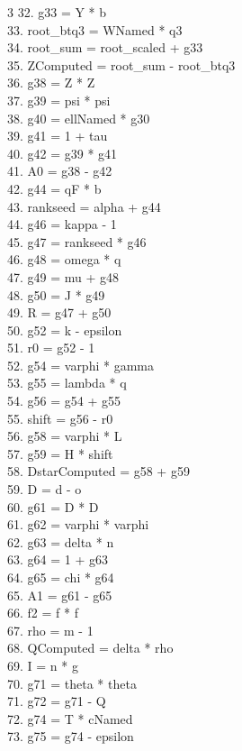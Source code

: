 \documentclass[10pt]{article}
\begin{document}
\begin{multicols}{3}
32. g33 = Y * b\\
33. root\_btq3 = WNamed * q3\\
34. root\_sum = root\_scaled + g33\\
35. ZComputed = root\_sum - root\_btq3\\
36. g38 = Z * Z\\
37. g39 = psi * psi\\
38. g40 = ellNamed * g30\\
39. g41 = 1 + tau\\
40. g42 = g39 * g41\\
41. A0 = g38 - g42\\
42. g44 = qF * b\\
43. rankseed = alpha + g44\\
44. g46 = kappa - 1\\
45. g47 = rankseed * g46\\
46. g48 = omega * q\\
47. g49 = mu + g48\\
48. g50 = J * g49\\
49. R = g47 + g50\\
50. g52 = k - epsilon\\
51. r0 = g52 - 1\\
52. g54 = varphi * gamma\\
53. g55 = lambda * q\\
54. g56 = g54 + g55\\
55. shift = g56 - r0\\
56. g58 = varphi * L\\
57. g59 = H * shift\\
58. DstarComputed = g58 + g59\\
59. D = d - o\\
60. g61 = D * D\\
61. g62 = varphi * varphi\\
62. g63 = delta * n\\
63. g64 = 1 + g63\\
64. g65 = chi * g64\\
65. A1 = g61 - g65\\
66. f2 = f * f\\
67. rho = m - 1\\
68. QComputed = delta * rho\\
69. I = n * g\\
70. g71 = theta * theta\\
71. g72 = g71 - Q\\
72. g74 = T * cNamed\\
73. g75 = g74 - epsilon\\

\end{multicols}
\end{document}
